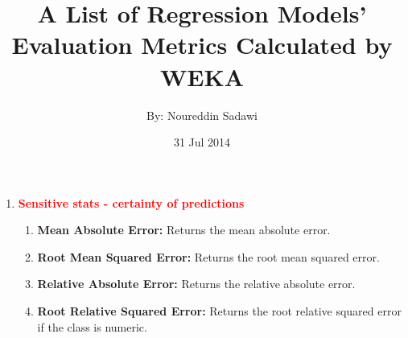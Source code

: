 \documentclass[a4paper,12pt, english]{article}
\begin{document}
\title{A List of Regression Models' Evaluation Metrics Calculated by WEKA}
\date{31 Jul 2014}
\author{By: Noureddin Sadawi}
\maketitle

\large

\begin{enumerate}

\item \textbf{\textcolor{red}{Sensitive stats - certainty of predictions}}
\begin{enumerate}

\item \textbf{Mean Absolute Error: }
      Returns the mean absolute error.
     

\item \textbf{Root Mean Squared Error: }
      Returns the root mean squared error.
                 

\item \textbf{Relative Absolute Error: }
      Returns the relative absolute error. 
      
          
\item \textbf{Root Relative Squared Error: }
      Returns the root relative squared error if the class is numeric. 
      

\end{enumerate}
\end{enumerate}
\end{document}
